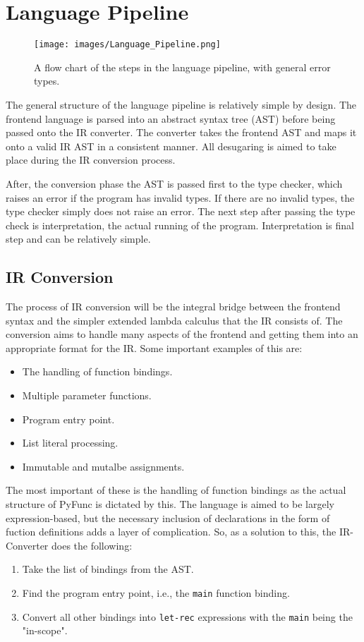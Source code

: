\documentclass{l4proj}
\begin{document}
\section{Language Pipeline}

\begin{figure}[h]
    \texttt{[image: images/Language\_Pipeline.png]}
    \caption{A flow chart of the steps in the language pipeline, with general error types.}
\end{figure}


The general structure of the language pipeline is relatively simple by design.
The frontend language is parsed into an abstract syntax tree (AST) before being passed onto the IR converter.
The converter takes the frontend AST and maps it onto a valid IR AST in a consistent manner.
All desugaring is aimed to take place during the IR conversion process.

After, the conversion phase the AST is passed first to the type checker, which raises an error if the program has invalid types.
If there are no invalid types, the type checker simply does not raise an error.
The next step after passing the type check is interpretation, the actual running of the program.
Interpretation is final step and can be relatively simple.


\subsection{IR Conversion}

The process of IR conversion will be the integral bridge between the frontend syntax and the simpler extended lambda calculus that the IR consists of.
The conversion aims to handle many aspects of the frontend and getting them into an appropriate format for the IR.
Some important examples of this are:
\begin{itemize}
    \item The handling of function bindings.
    \item Multiple parameter functions.
    \item Program entry point.
    \item List literal processing.
    \item Immutable and mutalbe assignments.
\end{itemize}

The most important of these is the handling of function bindings as the actual structure of PyFunc is dictated by this.
The language is aimed to be largely expression-based, but the necessary inclusion of declarations in the form of fuction definitions adds a layer of complication.
So, as a solution to this, the IR-Converter does the following:
\begin{enumerate}
    \item Take the list of bindings from the AST.
    \item Find the program entry point, i.e., the \texttt{main} function binding.
    \item Convert all other bindings into \texttt{let-rec} expressions with the \texttt{main} being the "in-scope".
\end{enumerate}
\end{document}
